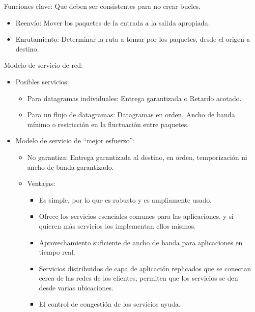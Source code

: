 \documentclass[12pt, twoside, openright]{report} %
\begin{document}
Funciones clave: Que deben ser consistentes para no crear bucles.

\begin{itemize}
	\item Reenvío: Mover los paquetes de la entrada a la salida apropiada.
	\item Enrutamiento: Determinar la ruta a tomar por los paquetes, desde
	      el origen a destino.
\end{itemize}

Modelo de servicio de red:

\begin{itemize}
	\item Posibles servicios:

	      \begin{itemize}
		      \item Para datagramas individuales: Entrega garantizada o Retardo
		            acotado.
		      \item Para un flujo de datagramas: Datagramas en orden, Ancho de banda
		            mínimo o restricción en la fluctuación entre paquetes.
	      \end{itemize}
	\item Modelo de servicio de ``mejor esfuerzo'':

	      \begin{itemize}
		      \item No garantiza: Entrega garantizada al destino, en orden,
		            temporización ni ancho de banda garantizado.
		      \item Ventajas:

		            \begin{itemize}
			            \item Es simple, por lo que es robusto y es ampliamente usado.
			            \item Ofrece los servicios esenciales comunes para las aplicaciones,
			                  y si quieren más servicios los implementan ellos mismos.
			            \item Aprovechamiento suficiente de ancho de banda para aplicaciones
			                  en tiempo real.
			            \item Servicios distribuidos de capa de aplicación replicados que se
			                  conectan cerca de las redes de los clientes, permiten que los
			                  servicios se den desde varias ubicaciones.
			            \item El control de congestión de los servicios ayuda.
		            \end{itemize}
	      \end{itemize}
\end{itemize}
\end{document}
